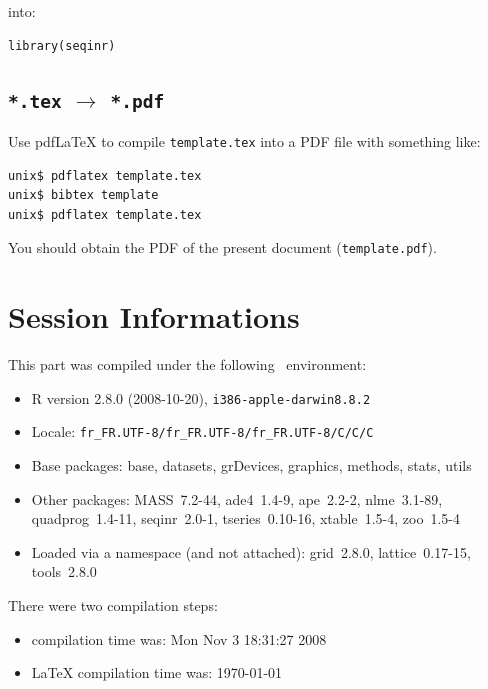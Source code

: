 \documentclass{article}
\begin{document}
into:

\begin{verbatim}
library(seqinr)
\end{verbatim}

\subsection{\texttt{*.tex} $\rightarrow$ \texttt{*.pdf}}

Use pdf\LaTeX{} to compile \texttt{template.tex} into a PDF file
with something like:

\begin{verbatim}
unix$ pdflatex template.tex
unix$ bibtex template
unix$ pdflatex template.tex
\end{verbatim}

You should obtain the PDF of the present document (\texttt{template.pdf}).



\section*{Session Informations}

This part was compiled under the following \Rlogo{}~environment:

\begin{itemize}
  \item R version 2.8.0 (2008-10-20), \verb|i386-apple-darwin8.8.2|
  \item Locale: \verb|fr_FR.UTF-8/fr_FR.UTF-8/fr_FR.UTF-8/C/C/C|
  \item Base packages: base, datasets, grDevices, graphics, methods,
    stats, utils
  \item Other packages: MASS~7.2-44, ade4~1.4-9, ape~2.2-2,
    nlme~3.1-89, quadprog~1.4-11, seqinr~2.0-1, tseries~0.10-16,
    xtable~1.5-4, zoo~1.5-4
  \item Loaded via a namespace (and not attached): grid~2.8.0,
    lattice~0.17-15, tools~2.8.0
\end{itemize}
There were two compilation steps:

\begin{itemize}
  \item \Rlogo{} compilation time was: Mon Nov  3 18:31:27 2008
  \item \LaTeX{} compilation time was: \today
\end{itemize}


\clearpage
{}


\end{document}
